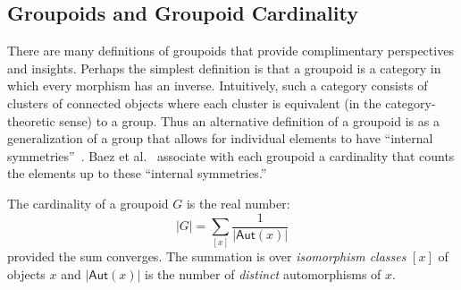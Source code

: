 \subsection{Groupoids and Groupoid Cardinality}

There are many definitions of groupoids that provide complimentary perspectives
and insights. Perhaps the simplest definition is that a groupoid is a category
in which every morphism has an inverse. Intuitively, such a category consists of
clusters of connected objects where each cluster is equivalent (in the
category-theoretic sense) to a group. Thus an alternative definition of a
groupoid is as a generalization of a group that allows for individual elements
to have ``internal symmetries''~\cite{groupoidintro}. Baez et
al.~\cite{2009arXiv0908.4305B} associate with each groupoid a cardinality that
counts the elements up to these ``internal symmetries.''

\begin{definition}
  The cardinality of a groupoid $G$ is the real number:
  \[
    |G| = \sum_{[x]} \frac{1}{|\textsf{Aut}(x)|}
  \]
  provided the sum converges. The summation is over \emph{isomorphism classes}
  $[x]$ of objects $x$ and $|\textsf{Aut}(x)|$ is the number of \emph{distinct}
  automorphisms of $x$.
\end{definition}

